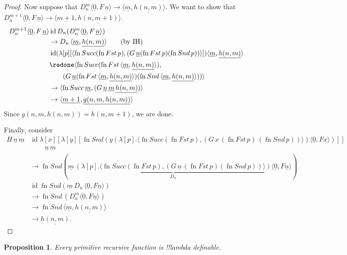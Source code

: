\documentclass[10pt,a4paper]{article}
\theoremstyle{plain}
\newtheorem{prop}[thm]{Proposition}
\theoremstyle{definition}
\theoremstyle{remark}
\providecommand{\tuple}[1]{\langle #1 \rangle}
\providecommand{\num}[1]{\underline{#1}}
\providecommand{\lambd}{\ensuremath{\lambda}}
\providecommand{\ident}{\operatorname{id}}
\providecommand{\red}{\mathrel{\rightarrow}}
\providecommand{\fn}{\operatorname{fn}}
\begin{document}
\begin{proof}
  Now suppose that $D_n^m \tuple{\num{0}, F\, \num{n}} \red
  \tuple{\num{m}, \num{h(n, m)}}$. We want to
  show that $D_n^{m+1} \tuple{\num{0}, F\, \num{n}} \red
  \tuple{\num{m+1}, \num{h(n, m+1)}}$.
  \begin{align*}
    D_n^{m+1} \tuple{\num{0}, F\, \num{n}}
    & \ident D_n(D_n^{m} \tuple{\num{0}, F\, \num{n}})\\
    & \red D_n\,\tuple{\num{m}, \num{h(n, m)}} \text{\qquad (by IH)}\\
    & \ident (\lambd[p][
      \tuple{
        \fn{Succ} (\fn{Fst}\, p), (G \, \num{n} (\fn{Fst}\, p) (\fn{Snd}\, p))
    }]) \tuple{\num{m}, \num{h(n,m)}}\\
    & \redone
    \tuple{\fn{Succ} (\fn{Fst}\, \tuple{\num{m}, \num{h(n,m)}}),\\
      & \qquad (G \, \num{n} (\fn{Fst}\, \tuple{\num{m}, \num{h(n,m)}}) (\fn{Snd}\, \tuple{\num{m}, \num{h(n,m)}}))}\\
    & \red 
    \tuple{\fn{Succ}\, \num{m}, (G \, \num{n} \,\num{m} \, \num{h(n,m)})}\\
    & \red \tuple{\num{m+1}, \num{g(n, m, h(n, m))}}
  \end{align*}
  Since $g(n, m, h(n, m)) = h(n, m+1)$, we are done.

  Finally, consider
  \begin{align*}
    H\,\num n\,\num m &\ident \lambd[x][\lambd[y][\fn{Snd} (y
        (\lambd[p].\tuple{\fn{Succ} (\fn{Fst}\, p), (G\, x\,
          (\fn{Fst}\, p)\, (\fn{Snd}\, p))}) \tuple{\num{0}, F x})]]\\
    & \qquad\,\num n\, \num m\\
    & \red \fn{Snd} (\num m \,
    \underbrace{(\lambd[p].\tuple{\fn{Succ} (\fn{Fst}\, p), (G \,\num n\,
      (\fn{Fst}\, p) (\fn{Snd}\, p))})}_{D_n} \tuple{\num{0}, F \num n})\\
    & \ident \fn{Snd} (\num m \, D_n\, \tuple{\num{0}, F \num n})\\
    & \red \fn{Snd} \,(D_n^m  \tuple{\num{0}, F \num n})\\
    & \red \fn{Snd} \,\tuple{\num{m}, \num{h(n, m)}} \\
    & \red \num{h(n,m)}. 
  \end{align*}  
\end{proof}


\begin{prop}
  Every primitive recursive function is !!{lambda definable}.
\end{prop}
\end{document}
